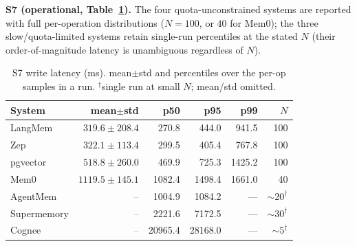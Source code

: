 \documentclass[11pt]{article}
\newcommand{\na}{\textcolor{gray}{--}}
\begin{document}
\textbf{S7 (operational, Table~\ref{tab:latency}).} The four quota-unconstrained
systems are reported with full per-operation distributions ($N{=}100$, or $40$ for
Mem0); the three slow/quota-limited systems retain single-run percentiles at the
stated $N$ (their order-of-magnitude latency is unambiguous regardless of $N$).

\begin{table}[t]
  \centering
  \small
  \caption{S7 write latency (ms). mean$\pm$std and percentiles over the per-op samples
  in a run. $^{\dagger}$single run at small $N$; mean/std omitted.}
  \label{tab:latency}
  \begin{tabular}{lrrrrr}
    \toprule
    System & mean$\pm$std & p50 & p95 & p99 & $N$ \\
    \midrule
    LangMem      & $319.6\pm208.4$ & 270.8 & 444.0 & 941.5 & 100 \\
    Zep          & $322.1\pm113.4$ & 299.5 & 405.4 & 767.8 & 100 \\
    pgvector     & $518.8\pm260.0$ & 469.9 & 725.3 & 1425.2 & 100 \\
    Mem0         & $1119.5\pm145.1$ & 1082.4 & 1498.4 & 1661.0 & 40 \\
    AgentMem     & \na & 1004.9 & 1084.2 & --- & ${\sim}20^{\dagger}$ \\
    Supermemory  & \na & 2221.6 & 7172.5 & --- & ${\sim}30^{\dagger}$ \\
    Cognee       & \na & 20965.4 & 28168.0 & --- & ${\sim}5^{\dagger}$ \\
    \bottomrule
  \end{tabular}
\end{table}
\end{document}
